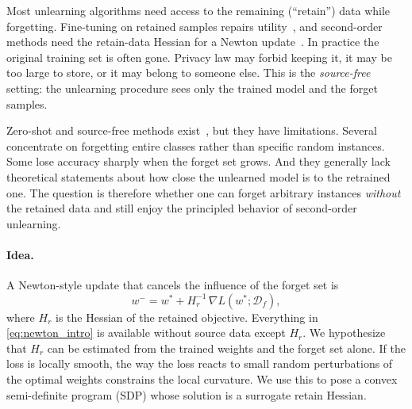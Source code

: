 \documentclass[10pt,twocolumn,letterpaper]{article}
\newcommand{\Df}{\mathcal{D}_f}
\newcommand{\Hr}{H_r}
\newcommand{\wstar}{w^{*}}
\newcommand{\wminus}{w^{-}}
\begin{document}
Most unlearning algorithms need access to the remaining (``retain'') data while forgetting. Fine-tuning on retained samples repairs utility~\cite{kurmanji2023towards,chundawat2023bad}, and second-order methods need the retain-data Hessian for a Newton update~\cite{guo2020certified,sekhari2021remember,golatkar2020eternal,warnecke2023machine}. In practice the original training set is often gone. Privacy law may forbid keeping it, it may be too large to store, or it may belong to someone else. This is the \emph{source-free} setting: the unlearning procedure sees only the trained model and the forget samples.

Zero-shot and source-free methods exist~\cite{chundawat2023zero,foster2024information,cheng2024remaining}, but they have limitations. Several concentrate on forgetting entire classes rather than specific random instances. Some lose accuracy sharply when the forget set grows. And they generally lack theoretical statements about how close the unlearned model is to the retrained one. The question is therefore whether one can forget arbitrary instances \emph{without} the retained data and still enjoy the principled behavior of second-order unlearning.

\paragraph{Idea.} A Newton-style update that cancels the influence of the forget set is
\begin{equation}
  \wminus = \wstar + \Hr^{-1}\,\nabla L(\wstar;\Df),
  \label{eq:newton_intro}
\end{equation}
where $\Hr$ is the Hessian of the retained objective. Everything in \cref{eq:newton_intro} is available without source data except $\Hr$. We hypothesize that $\Hr$ can be estimated from the trained weights and the forget set alone. If the loss is locally smooth, the way the loss reacts to small random perturbations of the optimal weights constrains the local curvature. We use this to pose a convex semi-definite program (SDP) whose solution is a surrogate retain Hessian.
\end{document}
